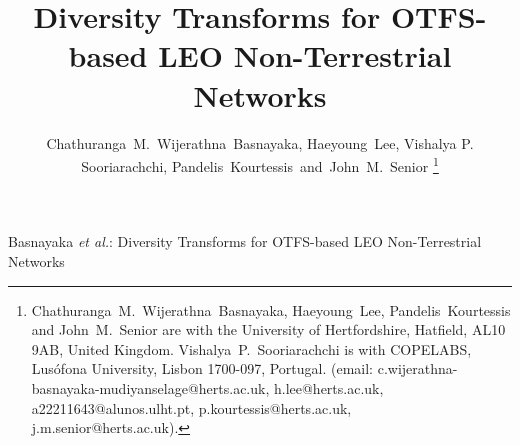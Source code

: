 \documentclass[journal]{IEEEtran}
\begin{document}
\title{Diversity Transforms for OTFS-based LEO Non-Terrestrial Networks}

\author{Chathuranga~M.~Wijerathna~Basnayaka, Haeyoung~Lee, Vishalya P. Sooriarachchi, Pandelis~Kourtessis~and~John~M.~Senior%
\thanks{Chathuranga~M.~Wijerathna~Basnayaka, Haeyoung~Lee, 
Pandelis~Kourtessis and John~M.~Senior are with the University 
of Hertfordshire, Hatfield, AL10 9AB, United Kingdom. 
Vishalya~P.~Sooriarachchi is with COPELABS, Lus\'{o}fona 
University, Lisbon 1700-097, Portugal. (email: 
c.wijerathna-basnayaka-mudiyanselage@herts.ac.uk, 
h.lee@herts.ac.uk, a22211643@alunos.ulht.pt, 
p.kourtessis@herts.ac.uk, j.m.senior@herts.ac.uk).}}


%
{Basnayaka \MakeLowercase{\textit{et al.}}: Diversity Transforms for OTFS-based LEO Non-Terrestrial Networks }


\maketitle
\end{document}
